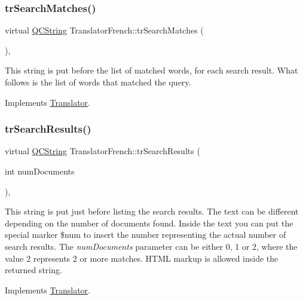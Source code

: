 \subsubsection{\texorpdfstring{trSearchMatches()}{trSearchMatches()}}
{\footnotesize\ttfamily virtual \mbox{\hyperlink{class_q_c_string}{Q\+C\+String}} Translator\+French\+::tr\+Search\+Matches (\begin{DoxyParamCaption}{ }\end{DoxyParamCaption})\hspace{0.3cm}{\ttfamily [inline]}, {\ttfamily [virtual]}}

This string is put before the list of matched words, for each search result. What follows is the list of words that matched the query. 

Implements \mbox{\hyperlink{class_translator}{Translator}}.

\mbox{\label{class_translator_french_a951f40a1cd5a3b8344986a0e7e71deec}} 
\subsubsection{\texorpdfstring{trSearchResults()}{trSearchResults()}}
{\footnotesize\ttfamily virtual \mbox{\hyperlink{class_q_c_string}{Q\+C\+String}} Translator\+French\+::tr\+Search\+Results (\begin{DoxyParamCaption}\item[{int}]{num\+Documents }\end{DoxyParamCaption})\hspace{0.3cm}{\ttfamily [inline]}, {\ttfamily [virtual]}}

This string is put just before listing the search results. The text can be different depending on the number of documents found. Inside the text you can put the special marker \$num to insert the number representing the actual number of search results. The {\itshape num\+Documents} parameter can be either 0, 1 or 2, where the value 2 represents 2 or more matches. H\+T\+ML markup is allowed inside the returned string. 

Implements \mbox{\hyperlink{class_translator}{Translator}}.

\mbox{\label{class_translator_french_a04e0a82fe31eb732cae660c7a8ef10fc}} 
